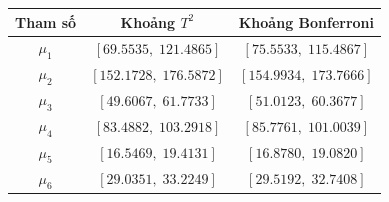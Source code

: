 \begin{center}\begin{tabular}{ccc}\toprule
Tham số & Khoảng $T^2$ & Khoảng Bonferroni\\\midrule
$\mu_1$ & $[69.5535,\;121.4865]$ & $[75.5533,\;115.4867]$\\
$\mu_2$ & $[152.1728,\;176.5872]$ & $[154.9934,\;173.7666]$\\
$\mu_3$ & $[49.6067,\;61.7733]$ & $[51.0123,\;60.3677]$\\
$\mu_4$ & $[83.4882,\;103.2918]$ & $[85.7761,\;101.0039]$\\
$\mu_5$ & $[16.5469,\;19.4131]$ & $[16.8780,\;19.0820]$\\
$\mu_6$ & $[29.0351,\;33.2249]$ & $[29.5192,\;32.7408]$\\
\bottomrule\end{tabular}\end{center}
